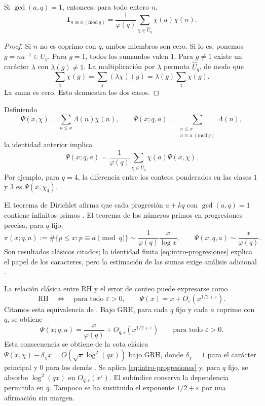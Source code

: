 \begin{proposicion}[Ortogonalidad]
Si $\gcd(a,q)=1$, entonces, para todo entero $n$,
\begin{equation}
 \mathbf1_{n\equiv a\ (\mathrm{mod}\ q)}
  =\frac1{\varphi(q)}\sum_{\chi\in\widehat U_q}
       \overline{\chi(a)}\chi(n).
 \label{eq:intro-ortogonalidad}
\end{equation}
\end{proposicion}
\begin{proof}
Si $n$ no es coprimo con $q$, ambos miembros son cero. Si lo es, ponemos
$g=na^{-1}\in U_q$. Para $g=1$, todos los sumandos valen $1$.
Para $g\ne1$ existe un carácter $\lambda$ con $\lambda(g)\ne1$.
La multiplicación por $\lambda$ permuta $\widehat U_q$, de modo que
\[
 \sum_\chi\chi(g)=\sum_\chi(\lambda\chi)(g)
 =\lambda(g)\sum_\chi\chi(g).
\]
La suma es cero. Esto demuestra los dos casos.
\end{proof}

Definiendo
\[
 \Psi(x,\chi)=\sum_{n\le x}\Lambda(n)\chi(n),\qquad
 \Psi(x;q,a)=\sum_{\substack{n\le x\\n\equiv a\ (\mathrm{mod}\ q)}}\Lambda(n),
\]
la identidad anterior implica
\begin{equation}
 \Psi(x;q,a)=\frac1{\varphi(q)}
  \sum_{\chi\in\widehat U_q}\overline{\chi(a)}\Psi(x,\chi).
 \label{eq:intro-progresiones}
\end{equation}
Por ejemplo, para $q=4$, la diferencia entre los conteos ponderados en
las clases $1$ y $3$ es $\Psi(x,\chi_4)$.

El teorema de Dirichlet afirma que cada progresión $a+kq$ con
$\gcd(a,q)=1$ contiene infinitos primos
\cite[Teo.~18.1]{sutherland-dirichlet}. El teorema de los números primos
en progresiones precisa, para $q$ fijo,
\[
 \pi(x;q,a):=\#\{p\le x:p\equiv a\pmod q\}
 \sim\frac1{\varphi(q)}\frac{x}{\log x},
 \qquad
 \Psi(x;q,a)\sim\frac{x}{\varphi(q)}.
\]
Son resultados clásicos citados; la identidad finita
\eqref{eq:intro-progresiones} explica el papel de los caracteres, pero
la estimación de las sumas exige análisis adicional
\cite[Teo.~4.12]{kedlaya-ant}.

La relación clásica entre RH y el error de conteo puede expresarse como
\begin{equation}
 \mathrm{RH}\quad\Longleftrightarrow\quad
 \text{para todo }\varepsilon>0,\qquad
 \Psi(x)=x+O_\varepsilon(x^{1/2+\varepsilon}).
 \label{eq:intro-error-rh}
\end{equation}
Citamos esta equivalencia de \cite[§25.16(i)]{dlmf-zeta}.
Bajo GRH, para cada $q$ fijo y cada $a$ coprimo con $q$, se obtiene
\[
 \Psi(x;q,a)=\frac{x}{\varphi(q)}
     +O_{q,\varepsilon}(x^{1/2+\varepsilon})
 \qquad\text{para todo }\varepsilon>0.
\]
Esta consecuencia se obtiene de la cota clásica
$\Psi(x,\chi)-\delta_\chi x=O(\sqrt{x}\log^2(qx))$ bajo GRH, donde
$\delta_\chi=1$ para el carácter principal y $0$ para los demás
\cite[pp.~19--20 del PDF]{vaughan-grh}. Se aplica
\eqref{eq:intro-progresiones} y, para $q$ fijo, se absorbe
$\log^2(qx)$ en $O_{q,\varepsilon}(x^\varepsilon)$.
El subíndice conserva la
dependencia permitida en $q$. Tampoco se ha sustituido el exponente
$1/2+\varepsilon$ por una afirmación sin margen.

